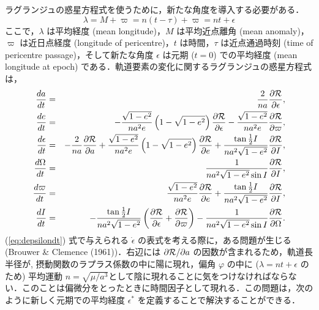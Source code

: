\documentclass[11pt,a4paper,oneside,onecolumn]{jreport}
\begin{document}
ラグランジュの惑星方程式を使うために，新たな角度を導入する必要がある．
\begin{equation}
\lambda = M + \varpi = n (t - \tau) + \varpi = n t + \epsilon \label{eq:lambda}
\end{equation}
ここで，$\lambda$ は平均経度 (mean longitude)，$M$ は平均近点離角 (mean anomaly)，$\varpi$ は近日点経度 (longitude of pericentre)，$t$ は時間，$\tau$ は近点通過時刻 (time of pericentre passage)，そして新たな角度 $\epsilon$ は元期 ($t = 0$) での平均経度 (mean longitude at epoch) である．軌道要素の変化に関するラグランジュの惑星方程式は，
\begin{eqnarray}
\frac{d a}{d t} & = & \frac{2}{n a} \frac{\partial {\cal R}}{\partial \epsilon}, \label{eq:dadt} \\
\frac{d e}{d t} & = & - \frac{\sqrt{1 - e^2}}{n a^2 e} \left( 1 - \sqrt{1 - e^2} \right) \frac{\partial {\cal R}}{\partial \epsilon} - \frac{\sqrt{1 - e^2}}{n a^2 e} \frac{\partial {\cal R}}{\partial \varpi}, \label{eq:dedt} \\
\frac{d \epsilon}{d t} & = & - \frac{2}{n a} \frac{\partial {\cal R}}{\partial a} + \frac{\sqrt{1 - e^2}}{n a^2 e} \left( 1 - \sqrt{1 - e^2} \right) \frac{\partial {\cal R}}{\partial e} + \frac{\tan \frac{1}{2} I}{n a^2 \sqrt{1 - e^2}} \frac{\partial {\cal R}}{\partial I}, \label{eq:depsilondt} \\
\frac{d \Omega}{d t} & = & \frac{1}{n a^2 \sqrt{1 - e^2} \sin I} \frac{\partial {\cal R}}{\partial I}, \label{eq:dOmegadt} \\
\frac{d \varpi}{d t} & = & \frac{\sqrt{1 - e^2}}{n a^2 e} \frac{\partial {\cal R}}{\partial e} + \frac{\tan \frac{1}{2} I}{n a^2 \sqrt{1 - e^2}} \frac{\partial {\cal R}}{\partial I}, \label{eq:dvarpidt} \\
\frac{d I}{d t} & = & - \frac{\tan \frac{1}{2} I}{n a^2 \sqrt{1 - e^2}} \left( \frac{\partial {\cal R}}{\partial \epsilon} + \frac{\partial {\cal R}}{\partial \varpi} \right) - \frac{1}{n a^2 \sqrt{1 - e^2} \sin I} \frac{\partial {\cal R}}{\partial \Omega}. \label{eq:dIdt}
\end{eqnarray}
(\ref{eq:depsilondt}) 式で与えられる $\dot{\epsilon}$ の表式を考える際に，ある問題が生じる (Brouwer \& Clemence (1961))．右辺には $\partial {\cal R}/\partial a$ の因数が含まれるため，軌道長半径が, 
摂動関数のラプラス係数の中に陽に現れ，偏角 $\varphi$ の中に ($\lambda = n t + \epsilon$ のため) 平均運動 $n = \sqrt{\mu /a^3}$として陰に現れることに気をつけなければならない．このことは偏微分をとったときに時間因子として現れる．この問題は，次のように新しく元期での平均経度 $\epsilon^{\ast}$ を定義することで解決することができる．
\end{document}
